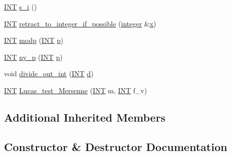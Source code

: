 \begin{DoxyCompactItemize}
\mbox{\hyperlink{galois_8h_a09fddde158a3a20bd2dcadb609de11dc}{I\+NT}} \mbox{\hyperlink{classlonginteger_aa0be3351b577305c0160b8bc8b4febde}{s\+\_\+i}} ()
\item 
\mbox{\hyperlink{galois_8h_a09fddde158a3a20bd2dcadb609de11dc}{I\+NT}} \mbox{\hyperlink{classlonginteger_a650d1f82c87e1f6a59a54a50e340394e}{retract\+\_\+to\+\_\+integer\+\_\+if\+\_\+possible}} (\mbox{\hyperlink{classinteger}{integer}} \&\mbox{\hyperlink{alphabet2_8_c_a6150e0515f7202e2fb518f7206ed97dc}{x}})
\item 
\mbox{\hyperlink{galois_8h_a09fddde158a3a20bd2dcadb609de11dc}{I\+NT}} \mbox{\hyperlink{classlonginteger_a4c554e7aa704ace8b97448c6d27fd4bd}{modp}} (\mbox{\hyperlink{galois_8h_a09fddde158a3a20bd2dcadb609de11dc}{I\+NT}} \mbox{\hyperlink{alphabet2_8_c_a533391314665d6bf1b5575e9a9cd8552}{p}})
\item 
\mbox{\hyperlink{galois_8h_a09fddde158a3a20bd2dcadb609de11dc}{I\+NT}} \mbox{\hyperlink{classlonginteger_a2e791f6e15c1ef6f7cd2dd3bf0a6d4c1}{ny\+\_\+p}} (\mbox{\hyperlink{galois_8h_a09fddde158a3a20bd2dcadb609de11dc}{I\+NT}} \mbox{\hyperlink{alphabet2_8_c_a533391314665d6bf1b5575e9a9cd8552}{p}})
\item 
void \mbox{\hyperlink{classlonginteger_ac4b65023c8de701153491d80577dfb9b}{divide\+\_\+out\+\_\+int}} (\mbox{\hyperlink{galois_8h_a09fddde158a3a20bd2dcadb609de11dc}{I\+NT}} \mbox{\hyperlink{simeon_8_c_a4339ca06fa882e69473d37bd6d7917d1}{d}})
\item 
\mbox{\hyperlink{galois_8h_a09fddde158a3a20bd2dcadb609de11dc}{I\+NT}} \mbox{\hyperlink{classlonginteger_ac65a8ac0562694fa12ad6b43d2eee7db}{Lucas\+\_\+test\+\_\+\+Mersenne}} (\mbox{\hyperlink{galois_8h_a09fddde158a3a20bd2dcadb609de11dc}{I\+NT}} m, \mbox{\hyperlink{galois_8h_a09fddde158a3a20bd2dcadb609de11dc}{I\+NT}} f\+\_\+v)
\end{DoxyCompactItemize}
\subsection*{Additional Inherited Members}


\subsection{Constructor \& Destructor Documentation}
\mbox{\label{classlonginteger_a24b89f33d73b2cfb7776d236fea6c61f}} 
